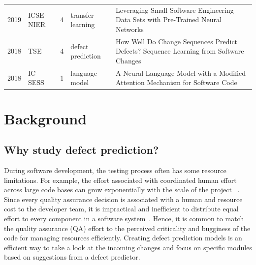 \documentclass[10pt,compsoc,twocolumn]{IEEEtran}
\begin{document}
\begin{table}[t!]
{\begin{tabularx}{\textwidth}{llrlL}
	2019 & ICSE-NIER & 4 & transfer learning & Leveraging Small Software Engineering Data Sets with Pre-Trained Neural Networks \cite{robbes2019leveraging} \\
	2018 & TSE & 4 & defect prediction & How Well Do Change Sequences Predict Defects? Sequence Learning from Software Changes \cite{wen2018well} \\ 
	2018 & IC SESS & 1 & language model & A Neural Language Model with a Modified Attention Mechanism for Software Code \cite{zhang2018neural} \\
 \bottomrule  
\end{tabularx}
}
\end{table}

\section{Background}
\label{sec:background}

\subsection{Why study defect prediction?}


During software development, the testing process  often has some resource limitations.
For example, the effort associated with coordinated human effort across large code bases can grow exponentially with the scale of the project ~\cite{fu2016tuning}.
Since every quality assurance decision is associated with a human and resource cost to the developer team, it is impractical and inefficient to distribute equal effort to every component in a software system~\cite{briand1993developing}.
Hence, 
it is common to match the quality assurance (QA) effort to the perceived criticality and bugginess of the code for managing resources efficiently. 
 Creating defect prediction models is an efficient way to take a look at the incoming changes and focus on specific modules based on suggestions from a defect predictor.  
\end{document}
